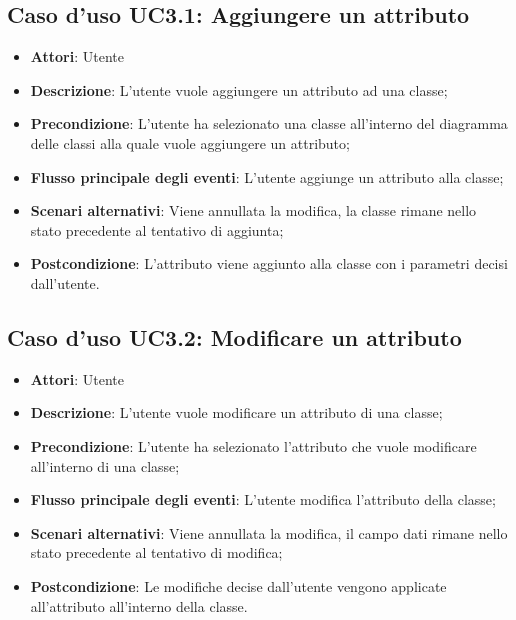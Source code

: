 \documentclass[../AnalisiDeiRequisiti.tex]{subfiles}
\begin{document}
		\subsection{Caso d'uso UC3.1: Aggiungere un attributo}
		\begin{itemize}
			\item \textbf{Attori}: Utente
			\item \textbf{Descrizione}: L'utente vuole aggiungere un attributo ad una classe;
			\item \textbf{Precondizione}: L'utente ha selezionato una classe all'interno del diagramma delle classi alla quale vuole aggiungere un attributo;
			\item \textbf{Flusso principale degli eventi}: L'utente aggiunge un attributo alla classe;
			\item \textbf{Scenari alternativi}: Viene annullata la modifica, la classe rimane nello stato precedente al tentativo di aggiunta;
			\item \textbf{Postcondizione}: L'attributo viene aggiunto alla classe con i parametri decisi dall'utente.
		\end{itemize}
		\subsection{Caso d'uso UC3.2: Modificare un attributo}
		\begin{itemize}
			\item \textbf{Attori}: Utente
			\item \textbf{Descrizione}: L'utente vuole modificare un attributo di una classe;
			\item \textbf{Precondizione}: L'utente ha selezionato l'attributo che vuole modificare all'interno di una classe;
			\item \textbf{Flusso principale degli eventi}: L'utente modifica l'attributo della classe;
			\item \textbf{Scenari alternativi}: Viene annullata la modifica, il campo dati rimane nello stato precedente al tentativo di modifica;
			\item \textbf{Postcondizione}: Le modifiche decise dall'utente vengono applicate all'attributo all'interno della classe.
		\end{itemize}
\end{document}
